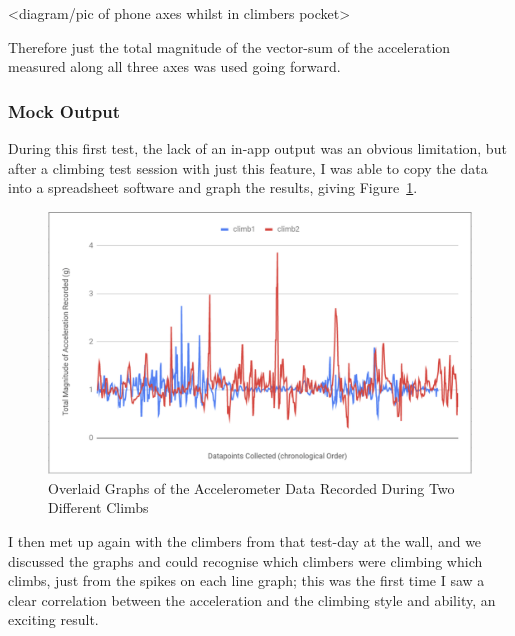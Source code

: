 <diagram/pic of phone axes whilst in climbers pocket>

Therefore just the total magnitude of the vector-sum of the acceleration measured along all three axes was used going forward.

\subsubsection{Mock Output}
During this first test, the lack of an in-app output was an obvious limitation, but after a climbing test session with just this feature, I was able to copy the data into a spreadsheet software and graph the results, giving Figure~\ref{fig:twoclimbsgraph}.

\begin{figure}[h]
\centering
\includegraphics[width=12cm]{imgs/graph_two_climbs}
\caption{Overlaid Graphs of the Accelerometer Data Recorded During Two Different Climbs}
\label{fig:twoclimbsgraph}
\end{figure}

I then met up again with the climbers from that test-day at the wall, and we discussed the graphs and could recognise which climbers were climbing which climbs, just from the spikes on each line graph; this was the first time I saw a clear correlation between the acceleration and the climbing style and ability, an exciting result.


